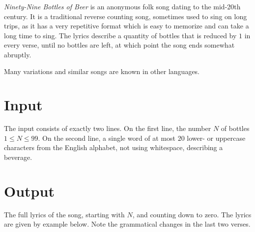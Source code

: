 

\emph{Ninety-Nine Bottles of Beer} is an anonymous folk song dating to the mid-20th century.
It is a traditional reverse counting song, sometimes used to sing on long trips, as it has a very repetitive format which is easy to memorize and can take a long time to sing.
The lyrics describe a quantity of bottles that is reduced by $1$ in every verse, until no bottles are left, at which point the song ends somewhat abruptly.

Many variations and similar songs are known in other languages.

\section*{Input}

The input consists of exactly two lines.
On the first line, the number $N$ of bottles $1\leq N\leq 99$.
On the second line, a single word of at most $20$ lower- or uppercase characters from the English alphabet, not using whitespace, describing a beverage.

\section*{Output}

The full lyrics of the song, starting with $N$, and counting down to zero.
The lyrics are given by example below.
Note the grammatical changes in the last two verses.
